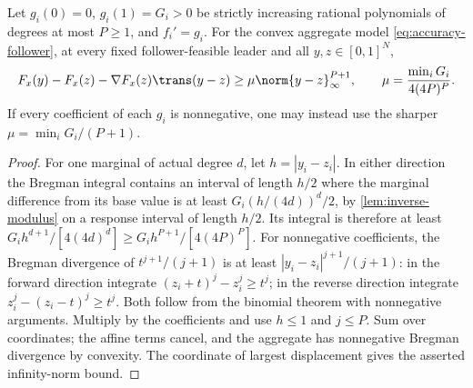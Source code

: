 \begin{lemma}
\label{lem:polynomial-bregman}
Let $g_i(0)=0$, $g_i(1)=G_i>0$ be strictly increasing rational
polynomials of degrees at most $P\ge1$, and $f_i'=g_i$. For the
convex aggregate model \eqref{eq:accuracy-follower}, at every fixed
follower-feasible leader and all $y,z\in[0,1]^N$,
\begin{equation}\label{eq:accuracy-bregman}
 F_x(y)-F_x(z)-\nabla F_x(z)\trans(y-z)
                 \ge\mu\norm{y-z}_\infty^{P+1},\qquad
 \mu=\frac{\min_iG_i}{4(4P)^P}.
\end{equation}
If every coefficient of each $g_i$ is nonnegative, one may instead
use the sharper $\mu=\min_iG_i/(P+1)$.
\end{lemma}
\begin{proof}
For one marginal of actual degree $d$, let $h=|y_i-z_i|$.
In either direction the Bregman integral contains an interval of length
$h/2$ where the marginal difference from its base value is at least
$G_i(h/(4d))^d/2$, by \cref{lem:inverse-modulus} on a response
interval of length $h/2$. Its integral is therefore at least
$G_ih^{d+1}/[4(4d)^d]\ge G_ih^{P+1}/[4(4P)^P]$.
For nonnegative coefficients, the Bregman divergence of
$t^{j+1}/(j+1)$ is at least $|y_i-z_i|^{j+1}/(j+1)$: in the
forward direction integrate $(z_i+t)^j-z_i^j\ge t^j$; in the
reverse direction integrate $z_i^j-(z_i-t)^j\ge t^j$.
Both follow from the binomial theorem with nonnegative arguments.
Multiply by the coefficients and use $h\le1$ and $j\le P$.
Sum over coordinates; the affine terms cancel, and the aggregate has
nonnegative Bregman divergence by convexity. The coordinate of largest
displacement gives the asserted infinity-norm bound.
\end{proof}

